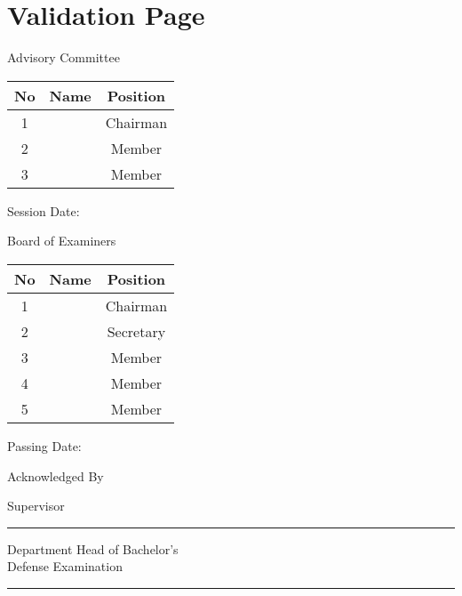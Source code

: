 
\newcommand{\namesigdate}[3][6cm]{%
\begin{minipage}{#1}
    #2 \vspace{3.0cm}\hrule\medskip
    \small \textit{#3}
\end{minipage}
}

\begingroup
\let\clearpage\relax
\let\cleardoublepage\relax

\chapter{Validation Page}
\label{chapter:sig-validation}

\begin{Center}
Advisory Committee
\end{Center}

\smallskip

\begin{table}
    \begin{tabular}{|c|c|c|}
    \hline
    No & Name  & Position \\ \hline \hline
    1  & ~     & Chairman \\ \hline
    2  & ~     & Member   \\ \hline
    3  & ~     & Member   \\ \hline
    \end{tabular}
\end{table}

\medskip

\begin{FlushRight}
Session Date: \myDateSession
\end{FlushRight}

\smallskip

\begin{Center}
Board of Examiners
\end{Center}

\begin{table}
    \begin{tabular}{|c|c|c|}
    \hline
    No & Name  & Position \\ \hline \hline
    1  & ~     & Chairman \\ \hline
    2  & ~     & Secretary   \\ \hline
    3  & ~     & Member   \\ \hline
    4  & ~     & Member   \\ \hline
    5  & ~     & Member   \\ \hline
    \end{tabular}
\end{table}

\medskip

\begin{FlushRight}
Passing Date: \myDatePassing
\end{FlushRight}

\begin{Center}
Acknowledged By
\end{Center}

\noindent
\namesigdate{Supervisor \\}{\mySupervisor}
\hfill
\namesigdate{Department Head of Bachelor’s \\ Defense Examination}{\myHeadExaminer}

\endgroup

